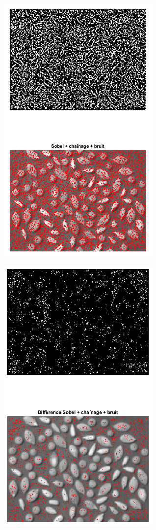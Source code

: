 \documentclass{article}
\begin{document}
\begin{itemize}[leftmargin=*]
\begin{itemize}[leftmargin=*]
\begin{minipage}[c]{0.46\linewidth}		
	\includegraphics[width=8cm]{Sobel_link_noise5.png}
\end{minipage}\hfill
\begin{minipage}[c]{0.46\linewidth}
	\includegraphics[width=8cm]{Diff_Sobel_link_noise5.png}
\end{minipage}\hfill


\end{itemize}
\end{itemize}
\end{document}
